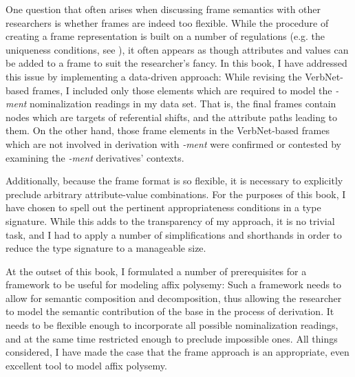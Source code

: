 One question that often arises when discussing frame semantics with other researchers is whether frames are indeed too flexible. While the procedure of creating a frame representation is built on a number of regulations (e.g. the uniqueness conditions, see ), it often appears as though attributes and values can be added to a frame to suit the researcher's fancy. 
In this book, I have addressed this issue by implementing a data-driven approach: While revising the VerbNet-based frames, I included only those elements which are required to model the \textit{-ment} nominalization readings in my data set. That is, the final frames contain nodes which are targets of referential shifts, and the attribute paths leading to them. On the other hand, those frame elements in the VerbNet-based frames which are not involved in derivation with \textit{-ment} were confirmed or contested by examining the \textit{-ment} derivatives' contexts.

Additionally, because the frame format is so flexible, it is necessary to explicitly preclude arbitrary attribute-value combinations. 
For the purposes of this book, I have chosen to spell out the pertinent appropriateness conditions in a type signature. While this adds to the transparency of my approach, it is no trivial task, and I had to apply a number of simplifications and shorthands in order to reduce the type signature to a manageable size. 

At the outset of this book, I formulated a number of prerequisites for a framework to be useful for modeling affix polysemy: Such a framework needs to allow for semantic composition and decomposition, thus allowing the researcher to model the semantic contribution of the base in the process of derivation. It needs to be flexible enough to incorporate all possible nominalization readings, and at the same time restricted enough to preclude impossible ones. 
All things considered, I have made the case that the frame approach is an appropriate, even excellent tool to model affix polysemy. 
